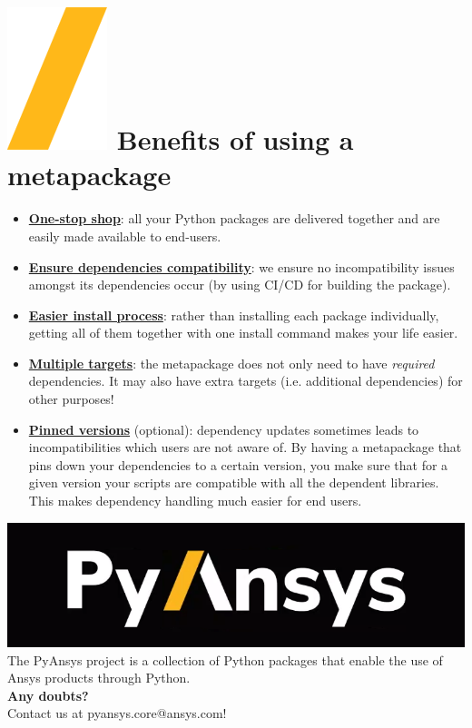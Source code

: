 \documentclass[a0paper,fleqn]{src/betterposter}
\begin{document}
{\section{\includegraphics[height=\fontcharht\font`\S]{img/general/slash.png} Benefits of using a\\ metapackage}
\vspace{-2cm}
\begin{itemize}
    \item \underline{\textbf{One-stop shop}}: all your Python packages are delivered together and are easily made available to end-users.
    \item \underline{\textbf{Ensure dependencies compatibility}}: we ensure no incompatibility issues amongst its dependencies occur (by using CI/CD for building the package).
    \item \underline{\textbf{Easier install process}}: rather than installing each package individually, getting all of them together with one install command makes your life easier.
    \item \underline{\textbf{Multiple targets}}: the metapackage does not only need to have \textit{required} dependencies. It may also have extra targets (i.e. additional dependencies) for other purposes!
    \item \underline{\textbf{Pinned versions}} (optional): dependency updates sometimes leads to incompatibilities which users are not aware of. By having a metapackage that pins down your dependencies to a certain version, you make sure that for a given version your scripts are compatible with all the dependent libraries. This makes dependency handling much easier for end users.

\end{itemize}
\vfill

\includegraphics[width=\textwidth]{img/general/pyansys_dark}\\
The PyAnsys project is a collection of Python packages that enable the use of Ansys products through Python.
\\
\newline
\textbf{Any doubts?} \\Contact us at pyansys.core@ansys.com!
\\
\newline

}
\end{document}
